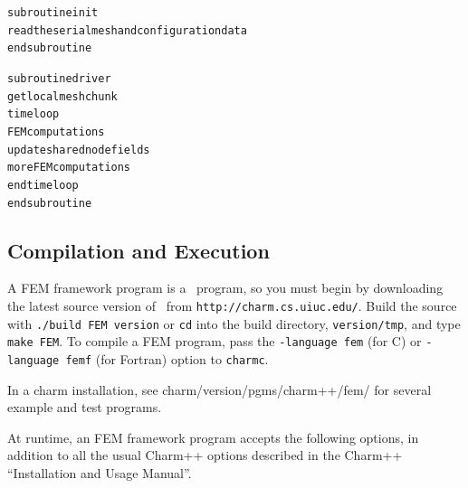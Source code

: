 \documentclass[10pt]{article}
\begin{document}
\begin{alltt}
     subroutine init
          read the serial mesh and configuration data
     end subroutine

     subroutine driver
          get local mesh chunk
          time loop
               FEM computations
               update shared node fields
               more FEM computations
          end time loop
     end subroutine
\end{alltt}

\subsection{Compilation and Execution}

A FEM framework program is a \charmpp\ program, so you must begin by
downloading the latest source version of \charmpp\ from
{\tt http://charm.cs.uiuc.edu/}.  Build the source with 
{\tt ./build FEM version} or {\tt cd} into the build directory, 
{\tt version/tmp}, and type {\tt make FEM}.
To compile a FEM program, pass the {\tt -language fem} (for C) or 
{\tt -language femf} (for Fortran) option to {\tt charmc}.

In a charm installation, see charm/version/pgms/charm++/fem/
for several example and test programs.

At runtime, an FEM framework program accepts the following
options, in addition to all the usual Charm++ options described in 
the Charm++ ``Installation and Usage Manual''.
\end{document}
